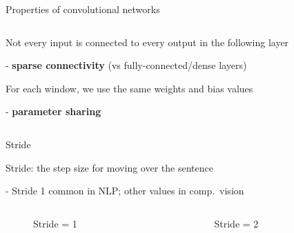 \documentclass[12pt]{beamer}
\begin{document}
\begin{frame}{Properties of convolutional networks}

\begin{columns}
	\begin{column}{6cm}
		Not every input is connected to every output in the following layer
		
		\bigskip
		
		- \textbf{sparse connectivity} (vs fully-connected/dense layers)
		
		\bigskip
		
		For each window, we use the same weights and bias values
		
		\bigskip
		
		- \textbf{parameter sharing}
		
	\end{column}
	\begin{column}{4cm}
		\scalebox{0.7}{
			\hspace{-2cm}
		}
	\end{column}
	
\end{columns}

\end{frame}


\begin{frame}{Stride}

Stride: the step size for moving over the sentence

- Stride 1 common in NLP; other values in comp.\ vision


\begin{columns}
	\begin{column}{4cm}
		\begin{figure}
		\scalebox{0.7}{
			\hspace{-2cm}
		}		
		\caption{Stride = 1}
		\end{figure}
	\end{column}
	\begin{column}{4cm}
		\begin{figure}
		\scalebox{0.7}{
			\hspace{-2cm}
		}
		\caption{Stride = 2}
		\end{figure}
	\end{column}
	
\end{columns}

	
\end{frame}
\end{document}
